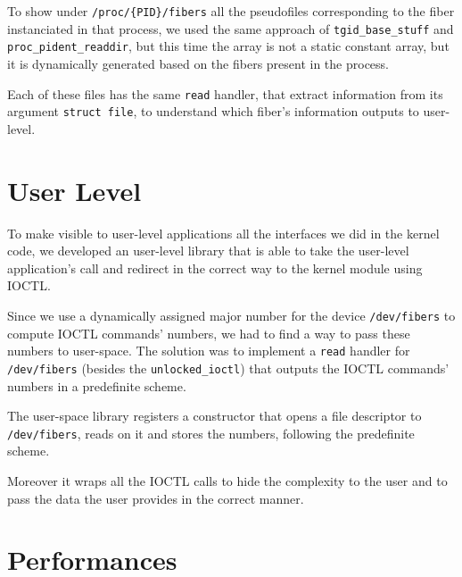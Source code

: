 \documentclass[a4paper]{article}
\begin{document}
To show under \texttt{/proc/\{PID\}/fibers} all the pseudofiles corresponding to the fiber instanciated in that process, we used the same approach of \texttt{tgid\_base\_stuff} and \texttt{proc\_pident\_readdir}, but this time the array is not a static constant array, but it is dynamically generated based on the fibers present in the process.

Each of these files has the same \texttt{read} handler, that extract information from its argument \texttt{struct file}, to understand which fiber's information outputs to user-level.

\section{User Level}
To make visible to user-level applications all the interfaces we did in the kernel code, we developed an user-level library that is able to take the user-level application's call and redirect in the correct way to the kernel module using IOCTL.

Since we use a dynamically assigned major number for the device \texttt{/dev/fibers} to compute IOCTL commands' numbers, we had to find a way to pass these numbers to user-space.
The solution was to implement a \texttt{read} handler for \texttt{/dev/fibers} (besides the \texttt{unlocked\_ioctl}) that outputs the IOCTL commands' numbers in a predefinite scheme.

The user-space library registers a constructor that opens a file descriptor to \texttt{/dev/fibers}, reads on it and stores the numbers, following the predefinite scheme.

Moreover it wraps all the IOCTL calls to hide the complexity to the user and to pass the data the user provides in the correct manner.



\section{Performances}
\end{document}
